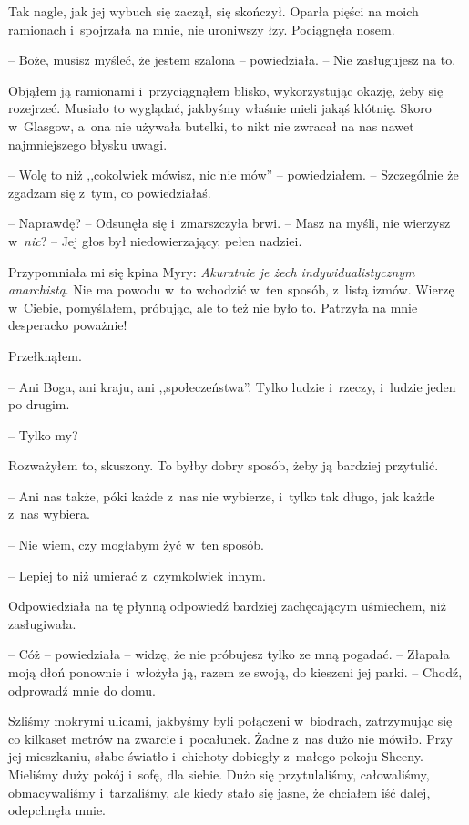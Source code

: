 \documentclass[oneside,polish,11pt,sfheadings]{mwbk}
\begin{document}
Tak nagle, jak jej wybuch się zaczął, się skończył. Oparła pięści na
moich ramionach i~spojrzała na mnie, nie uroniwszy łzy. Pociągnęła
nosem.

-- Boże, musisz myśleć, że jestem szalona -- powiedziała. -- Nie
zasługujesz na to.

Objąłem ją ramionami i~przyciągnąłem blisko, wykorzystując okazję, żeby
się rozejrzeć. Musiało to wyglądać, jakbyśmy właśnie mieli jakąś
kłótnię. Skoro w~Glasgow, a~ona nie używała butelki, to nikt nie zwracał
na nas nawet najmniejszego błysku uwagi.

-- Wolę to niż ,,cokolwiek mówisz, nic nie mów'' -- powiedziałem. -- Szczególnie że zgadzam się z~tym, co powiedziałaś.

-- Naprawdę? -- Odsunęła się i~zmarszczyła brwi. -- Masz na myśli, nie
wierzysz w~\emph{nic}? -- Jej głos był niedowierzający, pełen nadziei.

Przypomniała mi się kpina Myry: \emph{Akuratnie je żech
indywidualistycznym anarchistą}. Nie ma powodu w~to wchodzić w~ten
sposób, z~listą izmów. Wierzę w~Ciebie, pomyślałem, próbując, ale to też
nie było to. Patrzyła na mnie desperacko poważnie!

Przełknąłem. 

-- Ani Boga, ani kraju, ani ,,społeczeństwa''. Tylko ludzie i~rzeczy, i~ludzie jeden po drugim.

-- Tylko my?

Rozważyłem to, skuszony. To byłby dobry sposób, żeby ją bardziej
przytulić.

-- Ani nas także, póki każde z~nas nie wybierze, i~tylko tak długo, jak
każde z~nas wybiera.

-- Nie wiem, czy mogłabym żyć w~ten sposób.

-- Lepiej to niż umierać z~czymkolwiek innym.

Odpowiedziała na tę płynną odpowiedź bardziej zachęcającym uśmiechem,
niż zasługiwała.

-- Cóż -- powiedziała -- widzę, że nie próbujesz tylko ze mną pogadać. -- Złapała moją dłoń ponownie i~włożyła ją, razem ze swoją, do kieszeni jej
parki. -- Chodź, odprowadź mnie do domu.

Szliśmy mokrymi ulicami, jakbyśmy byli połączeni w~biodrach, zatrzymując
się co kilkaset metrów na zwarcie i~pocałunek. Żadne z~nas dużo nie
mówiło. Przy jej mieszkaniu, słabe światło i~chichoty dobiegły z~małego
pokoju Sheeny. Mieliśmy duży pokój i~sofę, dla siebie. Dużo się
przytulaliśmy, całowaliśmy, obmacywaliśmy i~tarzaliśmy, ale kiedy stało
się jasne, że chciałem iść dalej, odepchnęła mnie.
\end{document}
